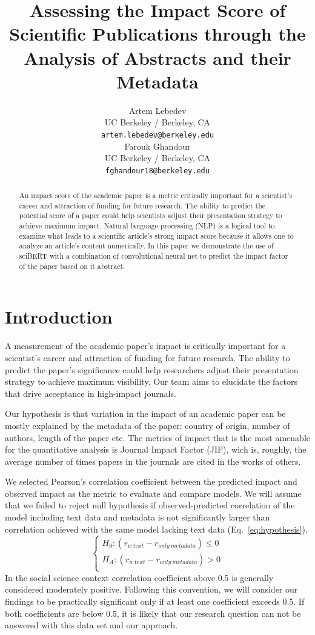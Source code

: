 \documentclass[11pt]{article}
\title{Assessing the Impact Score of Scientific Publications through the Analysis of Abstracts and their Metadata}
\author{Artem Lebedev\\
  UC Berkeley / Berkeley, CA \\
  \texttt{artem.lebedev@berkeley.edu} \\\And
 Farouk Ghandour \\
  UC Berkeley / Berkeley, CA \\
  \texttt{fghandour18@berkeley.edu} \\}
\begin{document}
\maketitle
\begin{abstract}
An impact score of the academic paper is a metric critically important for a scientist's career and attraction of funding for future research. The ability to predict the potential score of a paper could help scientists adjust their presentation strategy to achieve maximum impact. Natural language processing (NLP) is a logical tool to examine what leads to a scientific article's strong impact score because it allows one to analyze an article’s content numerically. In this paper we demonstrate the use of sciBERT with a combination of convolutional neural net to predict the impact factor of the paper based on it abstract.
\end{abstract}

\section{Introduction}
A measurement of the academic paper's impact is critically important for a scientist's career and attraction of funding for future research. The ability to predict the paper's significance could help researchers adjust their presentation strategy to achieve maximum visibility. Our team aims to elucidate the factors that drive acceptance in high-impact journals.

Our hypothesis is that variation in the impact of an academic paper can be mostly explained by the metadata of the paper: country of origin, number of authors, length of the paper etc. The metrics of impact that is the most amenable for the quantitative analysis is Journal Impact Factor (JIF), wich is, roughly, the average number of times papers in the journals are cited in the works of others.   

We selected Pearson's correlation coefficient between the predicted impact and observed impact as the metric to evaluate and compare models. We will assume that we failed to reject null hypothesis if observed-predicted correlation of the model including text data and metadata is not significantly larger than correlation achieved with the same model lacking text data (Eq.~\ref{eq:hypothesis}).
\begin{equation}\label{eq:hypothesis}
	\begin{cases}
		H_{0}: (r_{w\ text} - r_{only\ metadata}) \leq 0 \\
		H_{A}: (r_{w\ text} - r_{only\ metadata}) > 0\\
	\end{cases}       
\end{equation}
In the social science context correlation coefficient above 0.5 is generally considered moderately positive\citep{KahnemanDaniel2021N:af}. Following this convention, we will consider our findings to be practically significant only if at least one coefficient exceeds 0.5. If both coefficients are below 0.5, it is likely that our research question can not be answered with this data set and our approach. 
\end{document}
